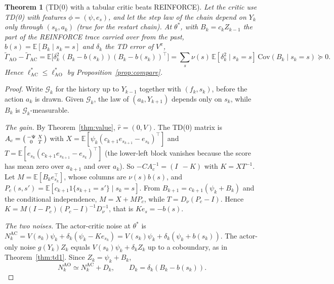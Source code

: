 \documentclass[11pt]{article}
\newtheorem{theorem}{Theorem}[section]
\theoremstyle{definition}
\theoremstyle{remark}
\newcommand{\E}{\mathbb{E}}
\begin{document}
\begin{theorem}[TD(0) with a tabular critic beats REINFORCE]\label{thm:td0}
Let the critic use TD(0) with features $\phi = (\psi, e_s)$, and let the step law of the chain depend
on $Y_k$ only through $(s_k, a_k)$ (true for the restart chain). At $\theta^*$, with
$B_k = c_kZ_{k-1}$ the part of the REINFORCE trace carried over from the past, $b(s) =
\E[B_k\mid s_k = s]$ and $\delta_k$ the TD error of $V^\pi$,
\[
  \tilde\Gamma_{\text{AO}} - \tilde\Gamma_{\text{AC}}
  = \E\big[\delta_k^2\,(B_k - b(s_k))(B_k - b(s_k))^\top\big]
  = \sum_s\nu(s)\,\E[\delta_k^2\mid s_k = s]\,\mathrm{Cov}(B_k\mid s_k = s) \succeq 0 .
\]
Hence $\ell^*_{\text{AC}} \le \ell^*_{\text{AO}}$ by Proposition~\ref{prop:compare}.
\end{theorem}
\begin{proof}
Write $\mathcal G_k$ for the history up to $Y_{k-1}$ together with $(f_k, s_k)$, before the action $a_k$
is drawn. Given $\mathcal G_k$, the law of $(a_k, Y_{k+1})$ depends only on $s_k$, while $B_k$ is
$\mathcal G_k$-measurable.

\emph{The gain.} By Theorem~\ref{thm:value}, $\hat r = (0, V)$. The TD(0) matrix is
$A_c = \begin{psmallmatrix}-\Psi & X\\ 0 & T\end{psmallmatrix}$ with
$X = \E[\psi_k(c_{k+1}e_{s_{k+1}} - e_{s_k})^\top]$ and $T = \E[e_{s_k}(c_{k+1}e_{s_{k+1}} - e_{s_k})^\top]$
(the lower-left block vanishes because the score has mean zero over $a_{k+1}$ and over $a_k$). So
$-CA_c^{-1} = (I\;\, -K)$ with $K = XT^{-1}$. Let $M = \E[B_ke_{s_k}^\top]$, whose columns are
$\nu(s)b(s)$, and $P_c(s,s') = \E[c_{k+1}1\{s_{k+1} = s'\}\mid s_k = s]$. From
$B_{k+1} = c_{k+1}(\psi_k + B_k)$ and the conditional independence, $M = X + MP_c$, while
$T = D_\nu(P_c - I)$. Hence $K = M(I - P_c)(P_c - I)^{-1}D_\nu^{-1}$, that is $Ke_s = -b(s)$.

\emph{The two noises.} The actor-critic noise at $\theta^*$ is
$N^{\text{AC}}_k = V(s_k)\psi_k + \delta_k(\psi_k - Ke_{s_k}) = V(s_k)\psi_k + \delta_k(\psi_k + b(s_k))$.
The actor-only noise $g(Y_k)Z_k$ equals $V(s_k)\psi_k + \delta_kZ_k$ up to a coboundary, as in
Theorem~\ref{thm:td1}. Since $Z_k = \psi_k + B_k$,
\[
  N^{\text{AO}}_k \simeq N^{\text{AC}}_k + D_k,\qquad D_k = \delta_k(B_k - b(s_k)).
\]


\end{proof}
\end{document}
